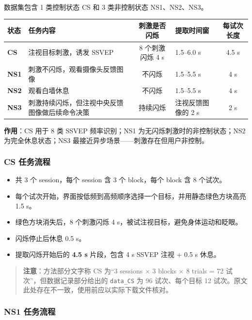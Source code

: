 \documentclass[12pt, a4paper]{ctexart}
\newcommand{\ttf}[1]{\texttt{#1}}
\begin{document}
数据集包含 1 类控制状态 CS 和 3 类非控制状态 NS1、NS2、NS3。

\begin{table}[h]
\centering\footnotesize
\begin{tabularx}{\textwidth}{llcYc}
\toprule
\textbf{状态} & \textbf{任务内容} & \textbf{刺激是否闪烁} & \textbf{提取时间窗} & \textbf{每试次长度} \\
\midrule
\textbf{CS} & 注视目标刺激，诱发 SSVEP & 8 个刺激闪烁 4 s & 1.5--6.0 s & 4.5 s \\
\textbf{NS1} & 刺激不闪烁，观看摄像头反馈图像 & 不闪烁 & 1.5--5.5 s & 4 s \\
\textbf{NS2} & 观看白墙休息 & 不闪烁 & 1.5--5.5 s & 4 s \\
\textbf{NS3} & 刺激持续闪烁，但注视中央反馈图像做后续命令决策 & 持续闪烁 & 注视反馈图像的 2 s & 2 s \\
\bottomrule
\end{tabularx}
\end{table}

\textbf{作用}：CS 用于 8 类 SSVEP 频率识别；NS1 为无闪烁刺激时的非控制状态；NS2 为完全休息状态；NS3 最接近异步场景——刺激存在但用户非控制。

\subsubsection*{CS 任务流程}

\begin{itemize}
  \item 共 3 个 session，每个 session 含 3 个 block，每个 block 含 8 个试次。
  \item 每个试次开始，界面按低频到高频顺序选择一个目标，并用静态绿色方块高亮 1.5 s。
  \item 绿色方块消失后，8 个刺激闪烁 4 s，被试注视目标，避免身体运动和眨眼。
  \item 闪烁停止后休息 0.5 s。
  \item 提取闪烁开始后的 \textbf{4.5 s} 片段，包含 4 s SSVEP 注视 + 0.5 s 休息。
\end{itemize}

\begin{quote}
\textbf{注意}：方法部分文字称 CS 为``3 sessions $\times$ 3 blocks $\times$ 8 trials = 72 试次''，但数据记录部分给出的 \ttf{data\_CS} 为 96 试次、每个目标 12 试次。原文此处存在不一致，使用前应以实际下载文件核对。
\end{quote}

\subsubsection*{NS1 任务流程}
\end{document}
